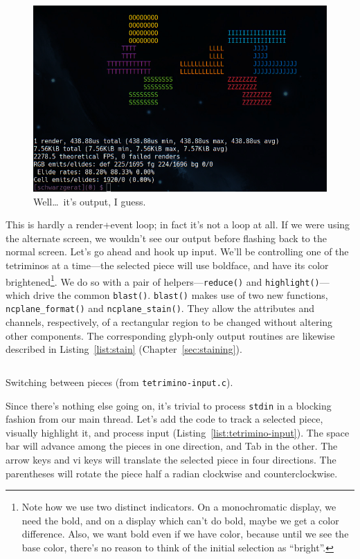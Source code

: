 \documentclass[letterpaper,10pt]{article}
\begin{document}
\begin{figure}[!htbp]
\centering \includegraphics[width=.5\linewidth]{media/tetriminos-1.png}
\caption{Well\ldots\ it's output, I guess.}
\label{fig:tetriminos-1}
\end{figure}

This is hardly a render+event loop; in fact it's not a loop at all. If we were
using the alternate screen, we wouldn't see our output before flashing back to
the normal screen. Let's go ahead and hook up input. We'll be controlling one
of the tetriminos at a time---the selected piece will use boldface, and have its
color brightened\footnote{Note how we use two distinct indicators. On a monochromatic
display, we need the bold, and on a display which can't do bold, maybe we get a
color difference. Also, we want bold even if we have color, because until we
see the base color, there's no reason to think of the initial selection as
``bright''.}. We do so with a pair of helpers---\texttt{reduce()} and \texttt{highlight()}---
which drive the common \texttt{blast()}. \texttt{blast()} makes use of two new functions,
\texttt{ncplane\_format()} and \texttt{ncplane\_stain()}. They allow the
attributes and channels, respectively, of a rectangular region to be changed
without altering other components. The corresponding glyph-only output routines
are likewise described in Listing~\ref{list:stain} (Chapter~\ref{sec:staining}).

\begin{listing}[!htbp]
\inputminted[]{C}{code/tetrimino-switch.h}
\caption{Switching between pieces (from \texttt{tetrimino-input.c}).}
\label{list:tetrimino-switch}
\end{listing}

Since there's nothing else going on, it's trivial to process \texttt{stdin} in
a blocking fashion from our main thread. Let's add the code to track a selected
piece, visually highlight it, and process input (Listing~\ref{list:tetrimino-input}).
The space bar will advance among the pieces in one direction,
and Tab in the other. The arrow keys and vi keys will translate the selected
piece in four directions. The parentheses will rotate the piece half a radian
clockwise and counterclockwise.
\end{document}
